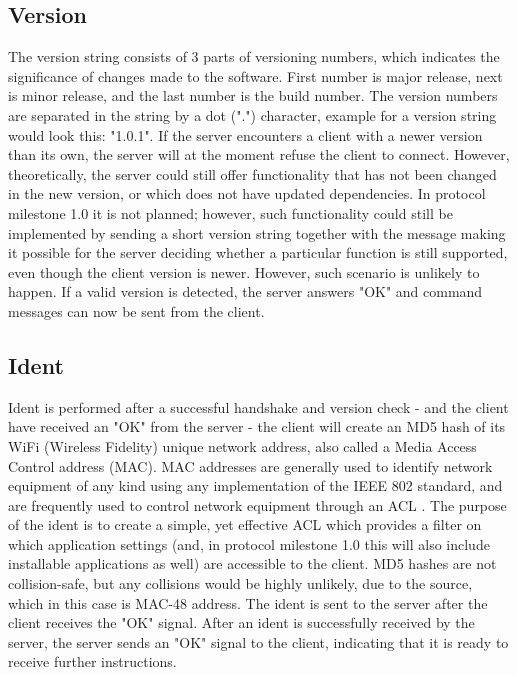 \subsection{Version} 
The version string consists of 3 parts of versioning numbers, which indicates the significance of changes made to the software. First number is major release, next is minor release, and the last number is the build number. The version numbers are separated in the string by a dot (".") character, example for a version string would look this: "1.0.1". If the server encounters a client with a newer version than its own, the server will at the moment refuse the client to connect. However, theoretically, the server could still offer functionality that has not been changed in the new version, or which does not have updated dependencies. In protocol milestone 1.0 it is not planned; however, such functionality could still be implemented by sending a short version string together with the message making it possible for the server deciding whether a particular function is still supported, even though the client version is newer. However, such scenario is unlikely to happen. 
If a valid version is detected, the server answers "OK" and command messages can now be sent from the client.

\subsection{Ident}
Ident is performed after a successful handshake and version check - and the client have received an "OK" from the server - the client will create an MD5 hash of its WiFi (Wireless Fidelity) unique network address, also called a Media Access Control address (MAC). MAC addresses are generally used to identify network equipment of any kind using any implementation of the IEEE 802 standard\cite{IEEE}, and are frequently used to control network equipment through an ACL \cite{cisco}. The purpose of the ident is to create a simple, yet effective ACL which provides a filter on which application settings (and, in protocol milestone 1.0 this will also include installable applications as well) are accessible to the client. MD5 hashes are not collision-safe\cite{ACCESSDATA}, but any collisions would be highly unlikely, due to the source, which in this case is MAC-48 address. 
The ident is sent to the server after the client receives the "OK" signal. After an ident is successfully received by the server, the server sends an "OK" signal to the client, indicating that it is ready to receive further instructions. 

